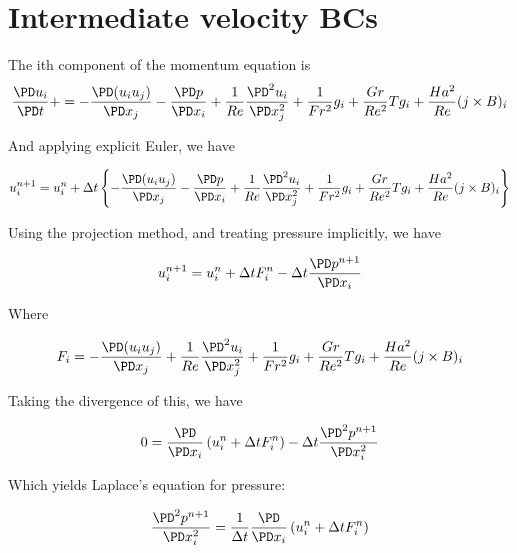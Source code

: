 \documentclass[11pt]{article}
\begin{document}
\doublespacing
\MOONSTITLE
\maketitle

\section{Intermediate velocity BCs}
The ith component of the momentum equation is
\begin{equation}
	\frac{\PD u_i}{\PD t} +
	=
	- \frac{\PD (u_i u_j)}{\PD x_j}
	- \frac{\PD p}{\PD x_i}
	+ \frac{1}{Re}
	\frac{\PD^2 u_i}{\PD x_j^2}
	+ \frac{1}{Fr^2}
	g_i
	+ \frac{Gr}{Re^2}
	T g_i
	+ \frac{Ha^2}{Re}
	(j \times B)_i
\end{equation}

And applying explicit Euler, we have

\begin{equation}
	u_i^{n+1}
	=
	u_i^n
	+
	\Delta t
	\left\{
	- \frac{\PD (u_i u_j)}{\PD x_j}
	- \frac{\PD p}{\PD x_i}
	+ \frac{1}{Re}
	\frac{\PD^2 u_i}{\PD x_j^2}
	+ \frac{1}{Fr^2}
	g_i
	+ \frac{Gr}{Re^2}
	T g_i
	+ \frac{Ha^2}{Re}
	(j \times B)_i
	\right\}
\end{equation}

Using the projection method, and treating pressure implicitly, we have

\begin{equation}
	u_i^{n+1}
	=
	u_i^n
	+
	\Delta t
	F_i^n
	-
	\Delta t
	\frac{\PD p^{n+1}}{\PD x_i}
\end{equation}

Where

\begin{equation}
	F_i
	=
	- \frac{\PD (u_i u_j)}{\PD x_j}
	+ \frac{1}{Re}
	\frac{\PD^2 u_i}{\PD x_j^2}
	+ \frac{1}{Fr^2}
	g_i
	+ \frac{Gr}{Re^2}
	T g_i
	+ \frac{Ha^2}{Re}
	(j \times B)_i
\end{equation}

Taking the divergence of this, we have

\begin{equation}
	0
	=
	\frac{\PD }{\PD x_i}
	\left(
	u_i^n
	+
	\Delta t
	F_i^n
	\right)
	-
	\Delta t
	\frac{\PD^2 p^{n+1}}{\PD x_i^2}
\end{equation}

Which yields Laplace's equation for pressure:

\begin{equation}
	\frac{\PD^2 p^{n+1}}{\PD x_i^2}
	=
	\frac{1}{\Delta t}
	\frac{\PD }{\PD x_i}
	\left(
	u_i^n
	+
	\Delta t
	F_i^n
	\right)
\end{equation}
\end{document}
